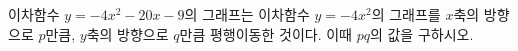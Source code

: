 \hspace*{2mm}\begin{minipage}[t]{\dimexpr\linewidth-2mm\relax}\vspace{0pt}
이차함수 $y=-4x^2-20x-9$의 그래프는 이차함수 $y=-4x^2$의 그래프를 $x$축의 방향으로 $p$만큼, $y$축의 방향으로 $q$만큼 평행이동한 것이다. 이때 $pq$의 값을 구하시오.\end{minipage}
